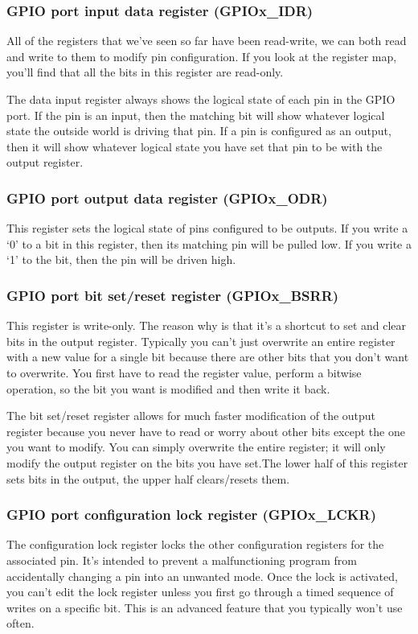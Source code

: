 \documentclass[11pt,fleqn]{book} %
\begin{document}
\subsubsection{GPIO port input data register (GPIOx\_IDR)}
All of the registers that we've seen so far have been read-write, we can both read and write to them to modify pin configuration. If you look at the register map, you'll find that all the bits in this register are read-only.

The data input register always shows the logical state of each pin in the GPIO port. If the pin is an input, then the matching bit will show whatever logical state the outside world is driving that pin. If a pin is configured as an output, then it will show whatever logical state you have set that pin to be with the output register.

\subsubsection{GPIO port output data register (GPIOx\_ODR)}
This register sets the logical state of pins configured to be outputs. If you write a `0' to a bit in this register, then its matching pin will be pulled low. If you write a `1' to the bit, then the pin will be driven high.

\subsubsection{GPIO port bit set/reset register (GPIOx\_BSRR)}
This register is write-only. The reason why is that it's a shortcut to set and clear bits in the output register. Typically you can't just overwrite an entire register with a new value for a single bit because there are other bits that you don't want to overwrite. You first have to read the register value, perform a bitwise operation, so the bit you want is modified and then write it back.

The bit set/reset register allows for much faster modification of the output register because you never have to read or worry about other bits except the one you want to modify. You can simply overwrite the entire register; it will only modify the output register on the bits you have set.The lower half of this register sets bits in the output, the upper half clears/resets them.

\subsubsection{GPIO port configuration lock register (GPIOx\_LCKR)}
The configuration lock register locks the other configuration registers for the associated pin. It's intended to prevent a malfunctioning program from accidentally changing a pin into an unwanted mode. Once the lock is activated, you can't edit the lock register unless you first go through a timed sequence of writes on a specific bit. This is an advanced feature that you typically won't use often.
\end{document}
